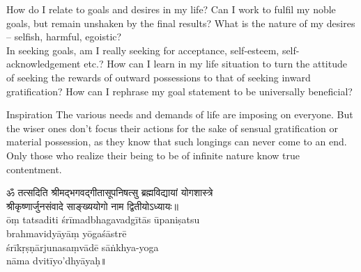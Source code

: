 \newpage
\begin{mananam}{}
\mananamtext How do I relate to goals and desires in my life? Can I work to fulfil my noble goals, but remain unshaken by the final results? What is the nature of my desires – selfish, harmful, egoistic?\\
In seeking goals, am I really seeking for acceptance, self-esteem, self-acknowledgement etc.? How can I learn in my life situation to turn the attitude of seeking the rewards of outward possessions to that of seeking inward gratification? How can I rephrase my goal statement to be universally beneficial?
\end{mananam}
\WritingHand{}
\begin{inspiration}{\mananamfont Inspiration}
\mananamtext The various needs and demands of life are imposing on everyone. But the wiser ones don’t focus their actions for the sake of sensual gratification or material possession, as they know that such longings can never come to an end.\\
Only those who realize their being to be of infinite nature know true contentment.
\end{inspiration}

\newpage
\begin{center}
{\devfont ॐ तत्सदिति श्रीमद्भगवद्गीतासूपनिषत्सु ब्रह्मविद्यायां योगशास्त्रे\\
श्रीकृष्णार्जुनसंवादे साङ्ख्ययोगो नाम द्वितीयोऽध्यायः॥ \\}
{\notosansdev\color{blue} ōṃ tatsaditi śrīmadbhagavadgītās ūpaniṣatsu \\brahmavidyāyāṃ yōgaśāstrē\\ śrīkṛṣṇārjunasaṃvādē sāṅkhya-yoga\\nāma  dvitīyo'dhyāyaḥ॥}
\end{center}
\chapEnd